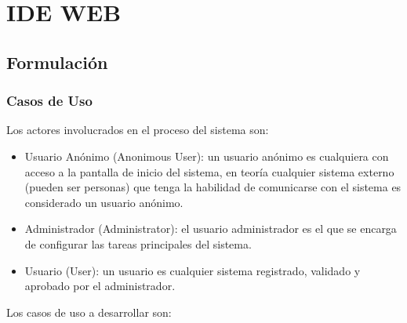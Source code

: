 \section{IDE WEB}
\subsection{Formulación}
\subsubsection{Casos de Uso}

Los actores involucrados en el proceso del sistema son:

\begin{itemize}

	\item{Usuario Anónimo} (Anonimous User): un usuario anónimo es cualquiera con acceso a la pantalla de inicio del sistema, en teoría cualquier sistema externo (pueden ser personas) que tenga la habilidad de comunicarse con el sistema es considerado un usuario anónimo.
	
	\item{Administrador} (Administrator): el usuario administrador es el que se encarga de configurar las tareas principales del sistema.
	
	\item{Usuario} (User): un usuario es cualquier sistema registrado, validado y aprobado por el administrador.

\end{itemize}

Los casos de uso a desarrollar son:


